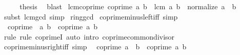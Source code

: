 \begin{isabellebody}
\ \ \isamarkupfalse%
\ \isamarkupfalse%
\ {\isacharquery}{\kern0pt}thesis\ \isamarkupfalse%
\ blast\isanewline
{}\isamarkupfalse%
%
\endisatagproof
{\isafoldproof}%
%
\isadelimproof
\isanewline
%
\endisadelimproof
\isanewline
{}\isamarkupfalse%
\ lcm{\isacharunderscore}{\kern0pt}coprime{\isacharcolon}{\kern0pt}\ {\isachardoublequoteopen}coprime\ a\ b\ {\isasymLongrightarrow}\ lcm\ a\ b\ {\isacharequal}{\kern0pt}\ normalize\ {\isacharparenleft}{\kern0pt}a\ {\isacharasterisk}{\kern0pt}\ b{\isacharparenright}{\kern0pt}{\isachardoublequoteclose}\isanewline
%
\isadelimproof
\ \ %
\endisadelimproof
%
\isatagproof
{}\isamarkupfalse%
\ {\isacharparenleft}{\kern0pt}subst\ lcm{\isacharunderscore}{\kern0pt}gcd{\isacharparenright}{\kern0pt}\ simp%
\endisatagproof
{\isafoldproof}%
%
\isadelimproof
\isanewline
%
\endisadelimproof
\isanewline
{}\isamarkupfalse%
\isanewline
\isanewline
{}\isamarkupfalse%
\ ring{\isacharunderscore}{\kern0pt}gcd\isanewline
{}\isanewline
\isanewline
{}\isamarkupfalse%
\ coprime{\isacharunderscore}{\kern0pt}minus{\isacharunderscore}{\kern0pt}left{\isacharunderscore}{\kern0pt}iff\ {\isacharbrackleft}{\kern0pt}simp{\isacharbrackright}{\kern0pt}{\isacharcolon}{\kern0pt}\isanewline
\ \ {\isachardoublequoteopen}coprime\ {\isacharparenleft}{\kern0pt}{\isacharminus}{\kern0pt}\ a{\isacharparenright}{\kern0pt}\ b\ {\isasymlongleftrightarrow}\ coprime\ a\ b{\isachardoublequoteclose}\isanewline
%
\isadelimproof
\ \ %
\endisadelimproof
%
\isatagproof
{}\isamarkupfalse%
\ {\isacharparenleft}{\kern0pt}rule{\isacharsemicolon}{\kern0pt}\ rule\ coprimeI{\isacharparenright}{\kern0pt}\ {\isacharparenleft}{\kern0pt}auto\ intro{\isacharcolon}{\kern0pt}\ coprime{\isacharunderscore}{\kern0pt}common{\isacharunderscore}{\kern0pt}divisor{\isacharparenright}{\kern0pt}%
\endisatagproof
{\isafoldproof}%
%
\isadelimproof
\isanewline
%
\endisadelimproof
\isanewline
{}\isamarkupfalse%
\ coprime{\isacharunderscore}{\kern0pt}minus{\isacharunderscore}{\kern0pt}right{\isacharunderscore}{\kern0pt}iff\ {\isacharbrackleft}{\kern0pt}simp{\isacharbrackright}{\kern0pt}{\isacharcolon}{\kern0pt}\isanewline
\ \ {\isachardoublequoteopen}coprime\ a\ {\isacharparenleft}{\kern0pt}{\isacharminus}{\kern0pt}\ b{\isacharparenright}{\kern0pt}\ {\isasymlongleftrightarrow}\ coprime\ a\ b{\isachardoublequoteclose}\isanewline
%
\isadelimproof
\ \ %
\endisadelimproof
%
\isatagproof
{}\isamarkupfalse%

\end{isabellebody}
